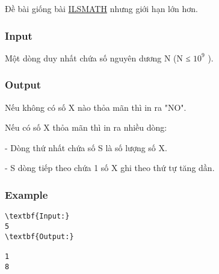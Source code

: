 

Đề bài giống bài \href{http://vnoi.info/problems/show/ILSMATH/}{ILSMATH} nhưng giới hạn lớn hơn.

\subsubsection{Input}

Một dòng duy nhất chứa số nguyên dương N (N ≤ $10^{9}$ ).

\subsubsection{Output}

Nếu không có số X nào thỏa mãn thì in ra "NO".

Nếu có số X thỏa mãn thì in ra nhiều dòng:


- Dòng thứ nhất chứa số S là số lượng số X.


- S dòng tiếp theo chứa 1 số X ghi theo thứ tự tăng dần.

\subsubsection{Example}
\begin{verbatim}
\textbf{Input:}
5
\textbf{Output:}

1
8\end{verbatim}
